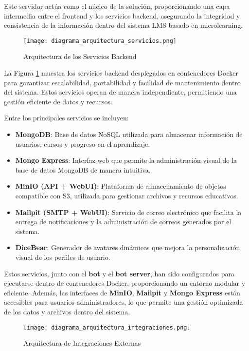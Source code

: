 Este servidor actúa como el núcleo de la solución, proporcionando una capa
intermedia entre el frontend y los servicios backend, asegurando la integridad y
consistencia de la información dentro del sistema LMS basado en microlearning.

\begin{figure}[htbp]
    \centering
    \texttt{[image: diagrama\_arquitectura\_servicios.png]}
    \caption{Arquitectura de los Servicios Backend}
    \label{fig:diagrama_arquitectura_servicios}
\end{figure}

La Figura \ref{fig:diagrama_arquitectura_servicios} muestra los servicios
backend desplegados en contenedores Docker para garantizar escalabilidad, portabilidad y
facilidad de mantenimiento dentro del sistema. Estos servicios operan de manera
independiente, permitiendo una gestión eficiente de datos y recursos.

Entre los principales servicios se incluyen:
\begin{itemize}
    \item \textbf{MongoDB}: Base de datos NoSQL utilizada para almacenar
    información de usuarios, cursos y progreso en el aprendizaje.
    \item \textbf{Mongo Express}: Interfaz web que permite la administración
    visual de la base de datos MongoDB de manera intuitiva.
    \item \textbf{MinIO (API + WebUI)}: Plataforma de almacenamiento de objetos
    compatible con S3, utilizada para gestionar archivos y recursos educativos.
    \item \textbf{Mailpit (SMTP + WebUI)}: Servicio de correo electrónico que
    facilita la entrega de notificaciones y la administración de correos
    generados por el sistema.
    \item \textbf{DiceBear}: Generador de avatares dinámicos que mejora la
    personalización visual de los perfiles de usuario.
\end{itemize}

Estos servicios, junto con el \textbf{bot} y el \textbf{bot server}, han sido
configurados para ejecutarse dentro de contenedores Docker, proporcionando un
entorno modular y eficiente. Además, las interfaces de \textbf{MinIO},
\textbf{Mailpit} y \textbf{Mongo Express} están accesibles para usuarios
administradores, lo que permite una gestión optimizada de los datos y archivos
dentro del sistema.

\begin{figure}[htbp]
    \centering
    \texttt{[image: diagrama\_arquitectura\_integraciones.png]}
    \caption{Arquitectura de Integraciones Externas}
    \label{fig:diagrama_arquitectura_integraciones}
\end{figure}

